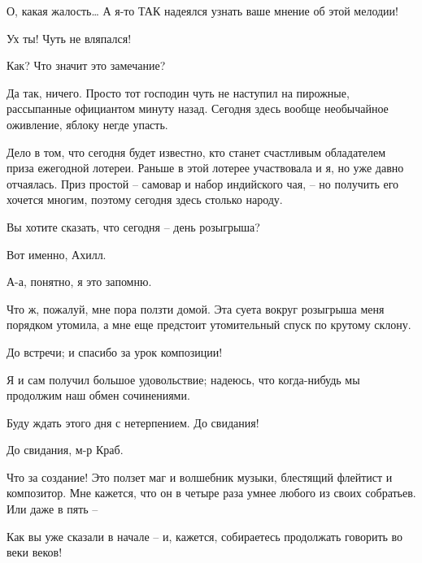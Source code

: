 \documentclass[../main.tex]{subfiles}
\begin{document}
\begin{dialogue}
 О, какая жалость\ldots{} А я-то ТАК надеялся узнать ваше мнение об этой мелодии!

 Ух ты! Чуть не вляпался!

 Как? Что значит это замечание?

 Да так, ничего. Просто тот господин чуть не наступил на пирожные, рассыпанные официантом минуту назад. Сегодня здесь вообще необычайное оживление, яблоку негде упасть.

 Дело в том, что сегодня будет известно, кто станет счастливым обладателем приза ежегодной лотереи. Раньше в этой лотерее участвовала и я, но уже давно отчаялась. Приз простой \--- самовар и набор индийского чая, \--- но получить его хочется многим, поэтому сегодня здесь столько народу.

 Вы хотите сказать, что сегодня \--- день розыгрыша?

 Вот именно, Ахилл.

 А-а, понятно, я это запомню.

 Что ж, пожалуй, мне пора ползти домой. Эта суета вокруг розыгрыша меня порядком утомила, а мне еще предстоит утомительный спуск по крутому склону.

 До встречи; и спасибо за урок композиции!

 Я и сам получил большое удовольствие; надеюсь, что когда-нибудь мы продолжим наш обмен сочинениями.

 Буду ждать этого дня с нетерпением. До свидания!

 До свидания, м-р Краб.


 Что за создание! Это ползет маг и волшебник музыки, блестящий флейтист и композитор. Мне кажется, что он в четыре раза умнее любого из своих собратьев. Или даже в пять \---

 Как вы уже сказали в начале \--- и, кажется, собираетесь продолжать говорить во веки веков!

\end{dialogue}
\end{document}
